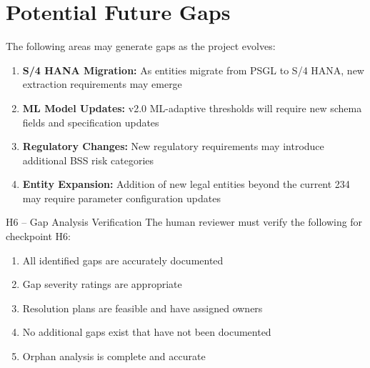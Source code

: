 \section{Potential Future Gaps}
\label{sec:future-gaps}

The following areas may generate gaps as the project evolves:

\begin{enumerate}
  \item \textbf{S/4 HANA Migration:} As entities migrate from PSGL to S/4 HANA,
        new extraction requirements may emerge
  \item \textbf{ML Model Updates:} v2.0 ML-adaptive thresholds will require
        new schema fields and specification updates
  \item \textbf{Regulatory Changes:} New regulatory requirements may introduce
        additional BSS risk categories
  \item \textbf{Entity Expansion:} Addition of new legal entities beyond the
        current 234 may require parameter configuration updates
\end{enumerate}

\begin{hitlbox}{H6 -- Gap Analysis Verification}
The human reviewer must verify the following for checkpoint H6:
\begin{enumerate}[noitemsep]
  \item All identified gaps are accurately documented
  \item Gap severity ratings are appropriate
  \item Resolution plans are feasible and have assigned owners
  \item No additional gaps exist that have not been documented
  \item Orphan analysis is complete and accurate
\end{enumerate}
\end{hitlbox}